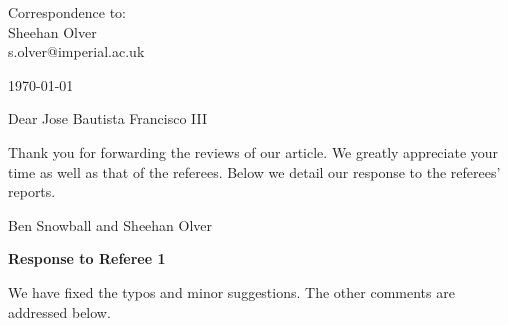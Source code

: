 \documentclass[10pt]{letter}
\begin{document}
\thispagestyle{empty}

\hfill
\begin{flushright}
Correspondence to: \\
Sheehan Olver \\
s.olver@imperial.ac.uk \\
\end{flushright}

\vspace{1em}
\hfill\today

Dear Jose Bautista Francisco III

Thank you for forwarding the reviews of our article. We greatly appreciate your time as well as that of the referees.  Below we detail our response to the referees' reports. 

Ben Snowball and Sheehan Olver

\bigskip 

\centerline{\textbf{Response to Referee 1}}

We have fixed the typos and minor suggestions. The other comments are addressed below.
\end{document}
